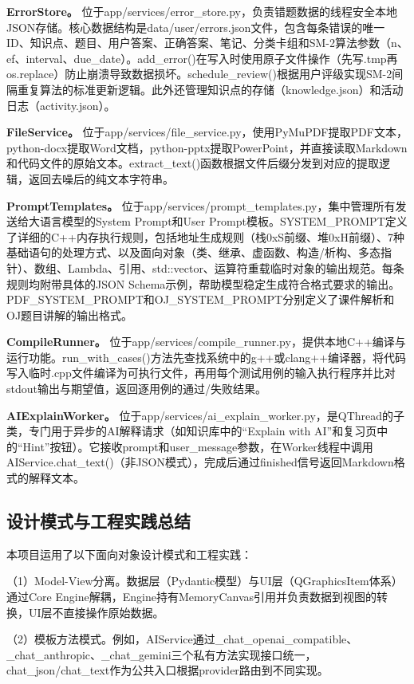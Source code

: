 \documentclass[12pt,a4paper]{ctexart}
\begin{document}
\textbf{ErrorStore。} 位于app/services/error\_store.py，负责错题数据的线程安全本地JSON存储。核心数据结构是data/user/errors.json文件，包含每条错误的唯一ID、知识点、题目、用户答案、正确答案、笔记、分类卡组和SM-2算法参数（n、ef、interval、due\_date）。add\_error()在写入时使用原子文件操作（先写.tmp再os.replace）防止崩溃导致数据损坏。schedule\_review()根据用户评级实现SM-2间隔重复算法的标准更新逻辑。此外还管理知识点的存储（knowledge.json）和活动日志（activity.json）。

\textbf{FileService。} 位于app/services/file\_service.py，使用PyMuPDF提取PDF文本，python-docx提取Word文档，python-pptx提取PowerPoint，并直接读取Markdown和代码文件的原始文本。extract\_text()函数根据文件后缀分发到对应的提取逻辑，返回去噪后的纯文本字符串。

\textbf{PromptTemplates。} 位于app/services/prompt\_templates.py，集中管理所有发送给大语言模型的System Prompt和User Prompt模板。SYSTEM\_PROMPT定义了详细的C++内存执行规则，包括地址生成规则（栈0xS前缀、堆0xH前缀）、7种基础语句的处理方式、以及面向对象（类、继承、虚函数、构造/析构、多态指针）、数组、Lambda、引用、std::vector、运算符重载临时对象的输出规范。每条规则均附带具体的JSON Schema示例，帮助模型稳定生成符合格式要求的输出。PDF\_SYSTEM\_PROMPT和OJ\_SYSTEM\_PROMPT分别定义了课件解析和OJ题目讲解的输出格式。

\textbf{CompileRunner。} 位于app/services/compile\_runner.py，提供本地C++编译与运行功能。run\_with\_cases()方法先查找系统中的g++或clang++编译器，将代码写入临时.cpp文件编译为可执行文件，再用每个测试用例的输入执行程序并比对stdout输出与期望值，返回逐用例的通过/失败结果。

\textbf{AIExplainWorker。} 位于app/services/ai\_explain\_worker.py，是QThread的子类，专门用于异步的AI解释请求（如知识库中的“Explain with AI”和复习页中的“Hint”按钮）。它接收prompt和user\_message参数，在Worker线程中调用AIService.chat\_text()（非JSON模式），完成后通过finished信号返回Markdown格式的解释文本。

\subsection{设计模式与工程实践总结}

本项目运用了以下面向对象设计模式和工程实践：

（1）Model-View分离。数据层（Pydantic模型）与UI层（QGraphicsItem体系）通过Core Engine解耦，Engine持有MemoryCanvas引用并负责数据到视图的转换，UI层不直接操作原始数据。

（2）模板方法模式。例如，AIService通过\_chat\_openai\_compatible、\_chat\_anthropic、\_chat\_gemini三个私有方法实现接口统一，chat\_json/chat\_text作为公共入口根据provider路由到不同实现。
\end{document}
